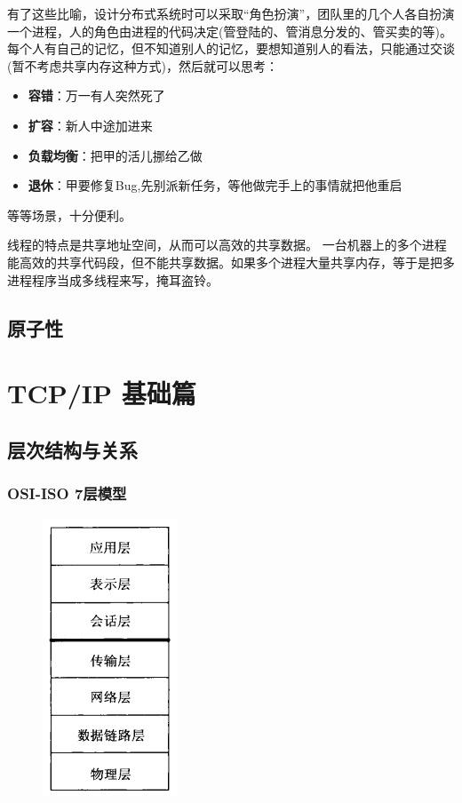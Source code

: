 \documentclass[UTF8,a4paper,8pt]{ctexbook}
\begin{document}
 	 有了这些比喻，设计分布式系统时可以采取“角色扮演”，团队里的几个人各自扮演一个进程，人的角色由进程的代码决定(管登陆的、管消息分发的、管买卖的等)。每个人有自己的记忆，但不知道别人的记忆，要想知道别人的看法，只能通过交谈(暂不考虑共享内存这种方式)，然后就可以思考：
 	 
	 	\begin{itemize}
		 	\item \textbf{容错}：万一有人突然死了
		 	\item \textbf{扩容}：新人中途加进来
		 	\item \textbf{负载均衡}：把甲的活儿挪给乙做
		 	\item \textbf{退休}：甲要修复Bug,先别派新任务，等他做完手上的事情就把他重启
	 	\end{itemize} 	
	 等等场景，十分便利。
	 
	 线程的特点是共享地址空间，从而可以高效的共享数据。 一台机器上的多个进程能高效的共享代码段，但不能共享数据。如果多个进程大量共享内存，等于是把多进程程序当成多线程来写，掩耳盗铃。		 	
	
	\section{原子性}
		
\chapter{TCP/IP 基础篇}    

	\section{层次结构与关系}	
		\subsection{OSI-ISO 7层模型}
				\begin{figure}[h]
					\centering
					\includegraphics[scale = 0.8]{OSI-Model.png}
				\end{figure}
			
\end{document}
